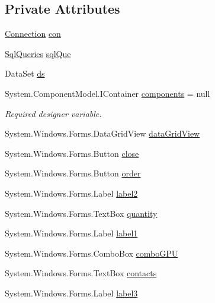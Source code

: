 \subsection*{Private Attributes}
\begin{DoxyCompactItemize}
\item 
\hyperlink{classproject__bot_1_1_connection}{Connection} \hyperlink{classproject__bot_1_1_add_order_a6e15404b1277c6dca7937876732940df}{con}
\item 
\hyperlink{classproject__bot_1_1_sql_queries}{Sql\+Queries} \hyperlink{classproject__bot_1_1_add_order_ac3cae6d6f1afb0e7f3d77d660096c332}{sql\+Que}
\item 
Data\+Set \hyperlink{classproject__bot_1_1_add_order_a0ed64438061ff68228ca5f23000ae7d2}{ds}
\item 
System.\+Component\+Model.\+I\+Container \hyperlink{classproject__bot_1_1_add_order_aba156eafb58395be1107f76bb2211419}{components} = null
\begin{DoxyCompactList}\small\item\em Required designer variable. \end{DoxyCompactList}\item 
System.\+Windows.\+Forms.\+Data\+Grid\+View \hyperlink{classproject__bot_1_1_add_order_a0fc587a228ed4c21982dd7ef600e4396}{data\+Grid\+View}
\item 
System.\+Windows.\+Forms.\+Button \hyperlink{classproject__bot_1_1_add_order_a025df3dc2403d150e2d83068225b67c7}{close}
\item 
System.\+Windows.\+Forms.\+Button \hyperlink{classproject__bot_1_1_add_order_ac179a11a70d874dbad1bc661ffec23f4}{order}
\item 
System.\+Windows.\+Forms.\+Label \hyperlink{classproject__bot_1_1_add_order_adbab584b04f358b114406ae1676cb599}{label2}
\item 
System.\+Windows.\+Forms.\+Text\+Box \hyperlink{classproject__bot_1_1_add_order_affe5efe13718f6f40fc6511c0b7dd679}{quantity}
\item 
System.\+Windows.\+Forms.\+Label \hyperlink{classproject__bot_1_1_add_order_ab196cf6fae252c722c4710a7b3e3e502}{label1}
\item 
System.\+Windows.\+Forms.\+Combo\+Box \hyperlink{classproject__bot_1_1_add_order_aaa9c51d4faa6d28e7602b4dc92e01a5c}{combo\+G\+PU}
\item 
System.\+Windows.\+Forms.\+Text\+Box \hyperlink{classproject__bot_1_1_add_order_aa58e6f1f55800b06c94a2c591fb5df3e}{contacts}
\item 
System.\+Windows.\+Forms.\+Label \hyperlink{classproject__bot_1_1_add_order_a9ac05fa5a5d211d2f50edaea7d659f44}{label3}

\end{DoxyCompactItemize}
